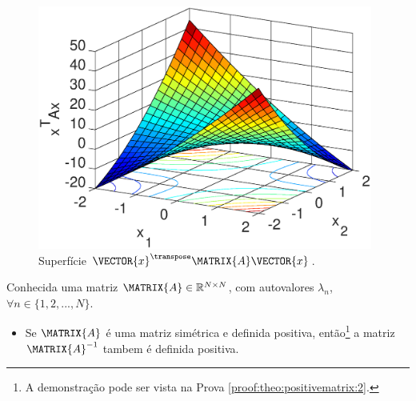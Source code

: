 \begin{minipage}{0.5\textwidth}
     \begin{figure}[H]
         \centering
         \includegraphics[width=0.98\textwidth]{chapters/teoria-basica/mfiles/positive-matrix/surfcexAx.eps}
         \caption{Superfície $\VECTOR{x}^{\transpose}\MATRIX{A}\VECTOR{x}$. }
         \label{fig:ex:positivematrix1}
     \end{figure}
\end{minipage}

\begin{theorem}\label{theo:positivematrix:2}
Conhecida uma matriz  $\MATRIX{A} \in \mathbb{R}^{N \times N}$, com  autovalores $\lambda_n$,
$\forall n \in \{1, 2, ..., N\}$.
\begin{itemize}
\item Se $\MATRIX{A}$ é uma matriz simétrica e definida positiva, então\footnote{A
demonstração pode ser vista na Prova \ref{proof:theo:positivematrix:2}.}  
a matriz $\MATRIX{A}^{-1}$ tambem é definida positiva.
\end{itemize}
\end{theorem}

